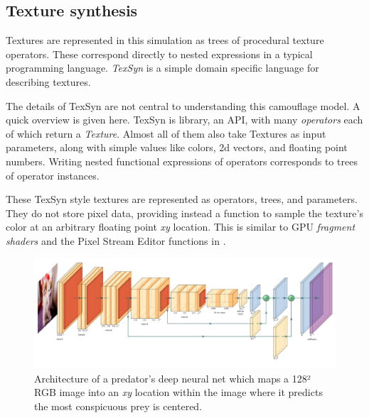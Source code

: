 \documentclass[sigconf]{acmart}
\newcommand{\jargon}[1]{\textit{#1}}
\begin{document}
\subsection{Texture synthesis}
Textures are represented in this simulation as trees of procedural texture operators. These correspond directly to nested expressions in a typical programming language. \jargon{TexSyn} is a simple domain specific language for describing textures.
\par
The details of TexSyn are not central to understanding this camouflage model. A quick overview is given here. TexSyn is library, an API, with many \jargon{operators} each of which return a \jargon{Texture}. Almost all of them also take Textures as input parameters, along with simple values like colors, 2d vectors, and floating point numbers. Writing nested functional expressions of operators corresponds to trees of operator instances.
\par
These TexSyn style textures are represented as operators, trees, and parameters. They do not store pixel data, providing instead a function to sample the texture's color at an arbitrary floating point \textit{xy} location. This is similar to GPU \jargon{fragment shaders} and the Pixel Stream Editor functions in \cite{perlin_image_1985}.
\par
[... see Figure \ref{fig:TexSyn_overview} ...]
\par


\begin{figure}
    \includegraphics[width=\columnwidth]{images/FCN8.pdf}
    \caption{Architecture of a predator's deep neural net which maps a 128² RGB image into an \textit{xy} location within the image where it predicts the most conspicuous prey is centered.}
    \label{fig:predator_cnn}
\end{figure}
\end{document}
